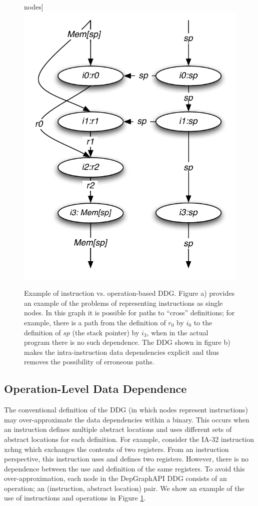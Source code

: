 \documentclass[12pt,titlepage]{article}
\begin{document}
\begin{figure}
\begin{center}
  nodes]{\label{ddg-b}\includegraphics[scale=0.75]{figs/DDG-b.pdf}}
\end{center}
\caption{Example of instruction vs. operation-based DDG. Figure a)
provides an example of the problems of representing instructions as
single nodes. In this graph it is possible for paths to ``cross''
definitions; for example, there is a path from the definition of $r_0$
by $i_0$ to the definition of $sp$ (the stack pointer) by $i_3$, when
in the actual program there is no such dependence. The DDG shown in
figure b) makes the intra-instruction data dependencies explicit and
thus removes the possibility of erroneous paths.}
\label{OperationsGraph}
\end{figure}


\subsection{Operation-Level Data Dependence}\label{OperationJustification}

The conventional definition of the DDG (in which nodes represent
instructions) may over-approximate the data dependencies within a
binary. This occurs when an instruction defines multiple abstract
locations and uses different sets of abstract locations for each
definition. For example, consider the IA-32 instruction xchng which
exchanges the contents of two registers. From an instruction
perspective, this instruction uses and defines two registers. However,
there is no dependence between the use and definition of the same
registers. To avoid this over-approximation, each node in the
DepGraphAPI DDG consists of an operation; an (instruction, abstract
location) pair. We show an example of the use of instructions and
operations in Figure \ref{OperationsGraph}.
\end{document}
